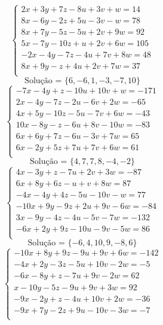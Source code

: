 \documentclass[12pt,oneside,a4paper]{article}
\begin{document}
\vspace{\baselineskip}
\begin{equation*}
\begin{cases}
2x+3y+7z-8u+3v+w=14 \\
8x-6y-2z+5u-3v-w=78 \\
8x+7y-5z-5u+2v+9w=92 \\
5x-7y-10z+u+2v+6w=105 \\
-2x-4y-7z-4u+7v+8w=48 \\
8x+9y-z+4u+2v+7w=37 \\
\end{cases}
\end{equation*}
\begin{equation*}
\text{Solução = }\{6,-6,1,-3,-7,10\}
\end{equation*}
\vspace{\baselineskip}
\begin{equation*}
\begin{cases}
-7x-4y+z-10u+10v+w=-171 \\
2x-4y-7z-2u-6v+2w=-65 \\
4x+5y-10z-5u-7v+6w=-43 \\
10x-8y-z-6u+8v-10w=-83 \\
6x+6y+7z-6u-3v+7w=65 \\
6x-2y+5z+7u+7v+6w=61 \\
\end{cases}
\end{equation*}
\begin{equation*}
\text{Solução = }\{4,7,7,8,-4,-2\}
\end{equation*}
\vspace{\baselineskip}
\begin{equation*}
\begin{cases}
4x-3y+z-7u+2v+3w=-87 \\
6x+8y+6z-u+v+8w=87 \\
-4x-4y+4z-5u-10v-w=77 \\
-10x+9y-9z+2u+9v-6w=-84 \\
3x-9y-4z-4u-5v-7w=-132 \\
-6x+2y+9z-10u-9v-5w=86 \\
\end{cases}
\end{equation*}
\begin{equation*}
\text{Solução = }\{-6,4,10,9,-8,6\}
\end{equation*}
\vspace{\baselineskip}
\begin{equation*}
\begin{cases}
-10x+8y+9z-9u+9v+6w=-142 \\
-4x+2y-3z-5u+10v-2w=-5 \\
-6x-8y+z-7u+9v-2w=62 \\
x-10y-5z-9u+9v+3w=92 \\
-9x-2y+z-4u+10v+2w=-36 \\
-9x+7y-2z+9u-10v-3w=-7 \\
\end{cases}
\end{equation*}
\end{document}
